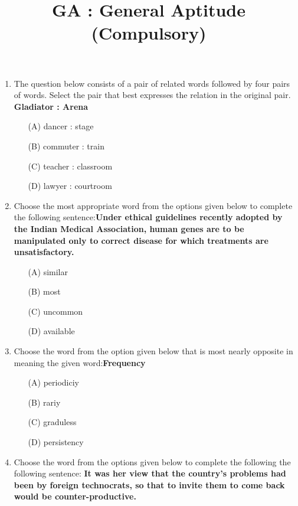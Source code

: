 \documentclass[journal]{IEEEtran}
\title{\textbf{GA : General Aptitude (Compulsory)}}
\begin{document}
\author{}
\maketitle
\begin{enumerate}
	\item{ The question below consists of a pair of related words followed by four pairs of words. Select the pair that best expresses the relation in the original pair.}
		\newline \textbf{Gladiator : Arena}
\begin{itemize}
\item[(A)] dancer : stage
\item[(B)] commuter : train
\item[(C)] teacher : classroom
\item[(D)] lawyer : courtroom
\end{itemize}


\item {Choose the most appropriate word from the options given below to complete the following sentence:\newline\textbf{Under ethical guidelines recently adopted by the Indian Medical Association, human genes are to be manipulated only to correct disease for which \underline{\hspace{2cm}}treatments are unsatisfactory.}}	
	\begin{itemize}
	\item[(A)] similar
	\item[(B)] most
	\item[(C)] uncommon
	\item[(D)] available
	\end{itemize}

\item{Choose the word from the option given below that is most nearly opposite in meaning the given word:\newline\textbf{Frequency}}

	\begin{itemize}
	\item[(A)] periodiciy
	\item[(B)] rariy
	\item[(C)] graduless
	\item[(D)] persistency
	\end{itemize}
	\item {Choose the word from the options given below to complete the following the following sentence:
	\newline\textbf{It was her view that the country's problems had been \underline{\hspace{2cm}}by foreign technocrats, so that to invite them to come back would be counter-productive.}}
		\begin{itemize}


\end{itemize}
\end{enumerate}
\end{document}
